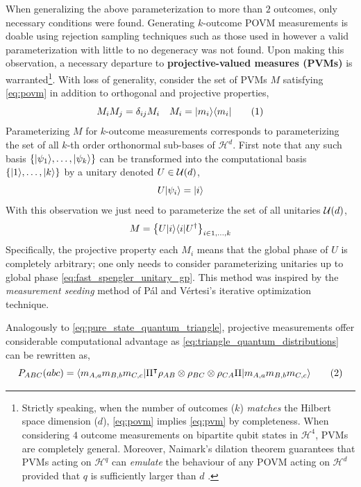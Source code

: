 \documentclass[aps, 10pt, english, twoside, pra, nofootinbib, longbibliography]{revtex4-1}
\theoremstyle{plain}
\theoremstyle{definition}
\theoremstyle{remark}
\newcommand{\netperm}{\Pi}
\newcommand{\Hilb}{\mathcal{H}}
\newcommand{\term}[1]{\textcolor{Mahogany}{\textbf{#1}}}
\begin{document}
    When generalizing the above parameterization to more than $2$ outcomes, only necessary conditions were found. Generating $k$-outcome POVM measurements is doable using rejection sampling techniques such as those used in \cite{Petz_2012} however a valid parameterization with little to no degeneracy was not found. Upon making this observation, a necessary departure to \term{projective-valued measures (PVMs)} is warranted\footnote{Strictly speaking, when the number of outcomes ($k$) \textit{matches} the Hilbert space dimension ($d$), \cref{eq:povm} implies \cref{eq:pvm} by completeness. When considering $4$ outcome measurements on bipartite qubit states in $\Hilb^4$, PVMs are completely general. Moreover, Naimark's dilation theorem guarantees that PVMs acting on $\Hilb^q$ can \textit{emulate} the behaviour of any POVM acting on $\Hilb^d$ provided that $q$ is sufficiently larger than $d$ \cite{Naimark}.}. With loss of generality, consider the set of PVMs $M$ satisfying \cref{eq:povm} in addition to orthogonal and projective properties,
    \[ M_i M_j = \de_{ij} M_i \quad M_i = \ket{m_i}\bra{m_i} \eq \label{eq:pvm}\]
    Parameterizing $M$ for $k$-outcome measurements corresponds to parameterizing the set of all $k$-th order orthonormal sub-bases of $\Hilb^d$.
    First note that any such basis $\bc{\ket{\psi_1}, \ldots, \ket{\psi_k}}$ can be transformed into the computational basis $\bc{\ket{1}, \ldots, \ket{k}}$ by a unitary denoted $U \in \mathcal{U}\br{d}$,
    \[ U \ket{\psi_i} = \ket{i} \]
    With this observation we just need to parameterize the set of all unitaries $\mathcal{U}\br{d}$,
    \[ M = \bc{ U\ket{i}\bra{i}U^\dagger }_{i \in 1, \ldots, k} \]
    Specifically, the projective property each $M_i$ means that the global phase of $U$ is completely arbitrary; one only needs to consider parameterizing unitaries up to global phase \cref{eq:fast_spengler_unitary_gp}. This method was inspired by the \textit{measurement seeding} method of P{\'{a}}l and V{\'{e}}rtesi's \cite{Pal_2010} iterative optimization technique.

    Analogously to \cref{eq:pure_state_quantum_triangle}, projective measurements offer considerable computational advantage as \cref{eq:triangle_quantum_distributions} can be rewritten as,
    \[ \prob[ABC]\br{abc} = \bramidket{m_{A,a}m_{B,b}m_{C,c}}{\netperm^\intercal \rho_{AB}\otimes\rho_{BC}\otimes\rho_{CA} \netperm}{m_{A,a}m_{B,b}m_{C,c}} \eq \label{eq:pure_meas_quantum_triangle} \]
\end{document}
